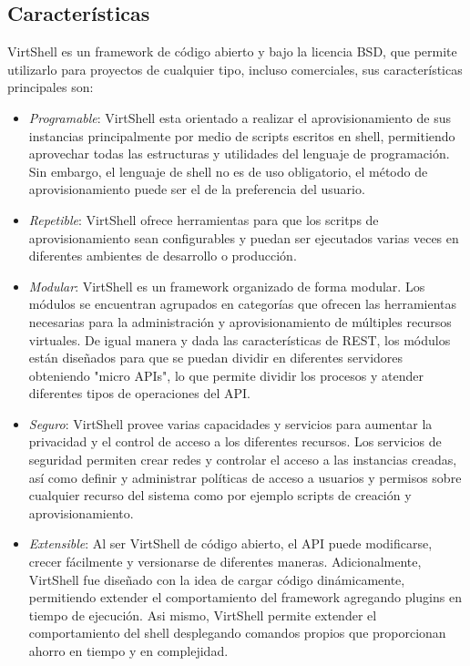\documentclass[conference, spanish]{IEEEtran}
\begin{document}
\subsection{Características}
VirtShell es un framework de código abierto y bajo la licencia BSD, que permite utilizarlo para proyectos de cualquier tipo, incluso comerciales, sus características principales son: 

\begin{itemize}
\item \emph{Programable}: VirtShell esta orientado a realizar el aprovisionamiento de sus instancias principalmente por medio de scripts escritos en shell, permitiendo aprovechar todas las estructuras y utilidades del lenguaje de programación. Sin embargo, el lenguaje de shell no es de uso obligatorio, el  método de aprovisionamiento puede ser el de la preferencia del usuario. 
\item \emph{Repetible}: VirtShell ofrece herramientas para que los scritps de aprovisionamiento sean configurables y  puedan ser ejecutados varias veces en diferentes ambientes de desarrollo o producción.
\item \emph{Modular}: VirtShell es un framework organizado de forma modular. Los módulos se encuentran agrupados en categorías que ofrecen las herramientas necesarias para la administración y aprovisionamiento de múltiples recursos virtuales. De igual manera y dada las características de REST, los módulos están diseñados para que se puedan dividir en diferentes servidores obteniendo "micro APIs", lo que permite dividir los procesos y atender diferentes tipos de operaciones del API. 
\item \emph{Seguro}: VirtShell provee varias capacidades y servicios para aumentar la privacidad y el control de acceso a los diferentes recursos. Los servicios de seguridad permiten crear redes y controlar el acceso a las instancias creadas, así como definir y administrar políticas de acceso a usuarios y permisos sobre cualquier recurso del sistema como por ejemplo scripts de creación y aprovisionamiento.
\item \emph{Extensible}: Al ser VirtShell de código abierto, el API puede modificarse, crecer fácilmente y versionarse de diferentes maneras. Adicionalmente, VirtShell fue diseñado con la idea de cargar código dinámicamente, permitiendo extender el comportamiento del framework agregando plugins en tiempo de ejecución.  Asi mismo, VirtShell permite extender el comportamiento del shell desplegando comandos propios que proporcionan ahorro en tiempo y en complejidad.

\end{itemize}
\end{document}
